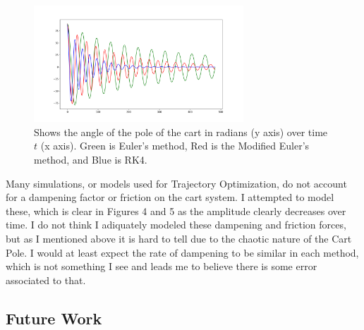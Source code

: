 \documentclass[12pt]{article}
\begin{document}
\begin{figure}[!ht]
 \centering
 \includegraphics[width=0.7\textwidth]{../data/Figure_2}
 \caption{Shows the angle of the pole of the cart in radians (y axis) over
 time $t$ (x axis). Green is Euler's method, Red is the Modified Euler's method, and Blue is RK4.}
 \label{fig:yub}
\end{figure}

Many simulations, or models used for Trajectory Optimization, do not account for a dampening
factor or friction on the cart system. I attempted to model these, which is clear in Figures
4 and 5 as the amplitude clearly decreases over time. I do not think I adiquately modeled
these dampening and friction forces, but as I mentioned above it is hard to tell due to the
chaotic nature of the Cart Pole. I would at least expect the rate of dampening to be similar
in each method, which is not something I see and leads me to believe there is some error associated
to that.

\subsection{Future Work}



\end{document}
